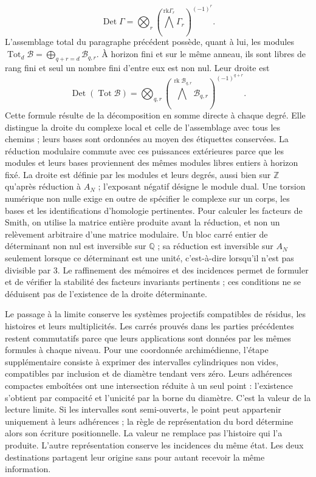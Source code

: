 \[
\operatorname{Det}\Gamma=
\bigotimes_r\left(\bigwedge^{\mathrm{rk}\Gamma_r}\Gamma_r\right)^{(-1)^r}.
\]
L'assemblage total du paragraphe précédent possède, quant à lui, les modules \(\operatorname{Tot}_d\mathcal B=\bigoplus_{q+r=d}\mathcal B_{q,r}\). À horizon fini et sur le même anneau, ils sont libres de rang fini et seul un nombre fini d'entre eux est non nul. Leur droite est
\[
\operatorname{Det}(\operatorname{Tot}\mathcal B)=
\bigotimes_{q,r}
\left(\bigwedge^{\operatorname{rk}\mathcal B_{q,r}}
\mathcal B_{q,r}\right)^{(-1)^{q+r}}.
\]
Cette formule résulte de la décomposition en somme directe à chaque degré. Elle distingue la droite du complexe local et celle de l'assemblage avec tous les chemins ; leurs bases sont ordonnées au moyen des étiquettes conservées. La réduction modulaire commute avec ces puissances extérieures parce que les modules et leurs bases proviennent des mêmes modules libres entiers à horizon fixé.
La droite est définie par les modules et leurs degrés, aussi bien sur \(\mathbb Z\) qu'après réduction à \(A_N\) ; l'exposant négatif désigne le module dual. Une torsion numérique non nulle exige en outre de spécifier le complexe sur un corps, les bases et les identifications d'homologie pertinentes. Pour calculer les facteurs de Smith, on utilise la matrice entière produite avant la réduction, et non un relèvement arbitraire d'une matrice modulaire. Un bloc carré entier de déterminant non nul est inversible sur \(\mathbb Q\) ; sa réduction est inversible sur \(A_N\) seulement lorsque ce déterminant est une unité, c'est-à-dire lorsqu'il n'est pas divisible par \(3\). Le raffinement des mémoires et des incidences permet de formuler et de vérifier la stabilité des facteurs invariants pertinents ; ces conditions ne se déduisent pas de l'existence de la droite déterminante.

Le passage à la limite conserve les systèmes projectifs compatibles de résidus, les histoires et leurs multiplicités. Les carrés prouvés dans les parties précédentes restent commutatifs parce que leurs applications sont données par les mêmes formules à chaque niveau. Pour une coordonnée archimédienne, l’étape supplémentaire consiste à exprimer des intervalles cylindriques non vides, compatibles par inclusion et de diamètre tendant vers zéro. Leurs adhérences compactes emboîtées ont une intersection réduite à un seul point : l’existence s’obtient par compacité et l’unicité par la borne du diamètre. C’est la valeur de la lecture limite. Si les intervalles sont semi-ouverts, le point peut appartenir uniquement à leurs adhérences ; la règle de représentation du bord détermine alors son écriture positionnelle. La valeur ne remplace pas l’histoire qui l’a produite. L’autre représentation conserve les incidences du même état. Les deux destinations partagent leur origine sans pour autant recevoir la même information.

